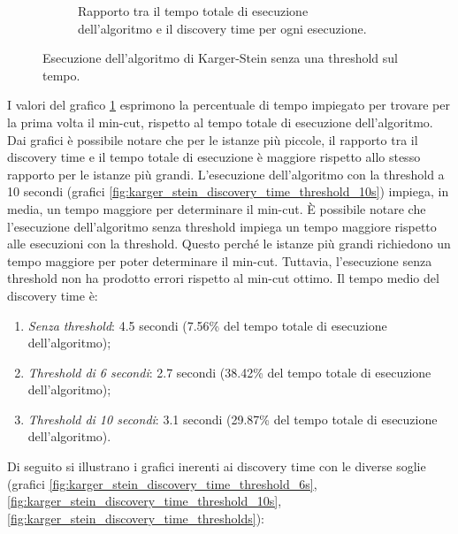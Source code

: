 \begin{figure}[H]
\begin{subfigure}{.49\textwidth}
		\caption{Rapporto tra il tempo totale di esecuzione dell'algoritmo 
		e il discovery time per ogni esecuzione.}
		\label{fig:karger_stein_rapporto_discovery_time_total_time}
	\end{subfigure}
	\caption{Esecuzione dell'algoritmo di Karger-Stein senza una threshold sul tempo.}
	\label{fig:karger_stein_discovery_time}
\end{figure}

I valori del grafico \ref{fig:karger_stein_rapporto_discovery_time_total_time} 
esprimono la percentuale di tempo impiegato per trovare per la prima 
volta il min-cut, rispetto al tempo totale di esecuzione dell'algoritmo.
Dai grafici è possibile notare che per le istanze più piccole, il rapporto 
tra il discovery time e il tempo totale di esecuzione è maggiore rispetto 
allo stesso rapporto per le istanze più grandi.
L'esecuzione dell'algoritmo con la threshold a 10 secondi (grafici 
\ref{fig:karger_stein_discovery_time_threshold_10s}) impiega, in media, un tempo maggiore per determinare il min-cut. È possibile notare che 
l'esecuzione dell'algoritmo senza threshold impiega un tempo maggiore rispetto 
alle esecuzioni con la threshold. Questo perché le istanze più grandi richiedono 
un tempo maggiore per poter determinare il min-cut. Tuttavia, l'esecuzione senza 
threshold non ha prodotto errori rispetto al min-cut ottimo. Il tempo medio del 
discovery time è:
\begin{enumerate}
	\item \textit{Senza threshold}: 4.5 secondi (7.56\% del tempo totale di 
	esecuzione dell'algoritmo);
	\item \textit{Threshold di 6 secondi}: 2.7 secondi (38.42\% del tempo totale di 
	esecuzione dell'algoritmo);
	\item \textit{Threshold di 10 secondi}: 3.1 secondi (29.87\% del tempo totale di 
	esecuzione dell'algoritmo).
\end{enumerate}

\pagebreak

\noindent Di seguito si illustrano i grafici inerenti ai discovery time con le diverse soglie 
(grafici \ref{fig:karger_stein_discovery_time_threshold_6s}, 
\ref{fig:karger_stein_discovery_time_threshold_10s}, 
\ref{fig:karger_stein_discovery_time_thresholds}):

